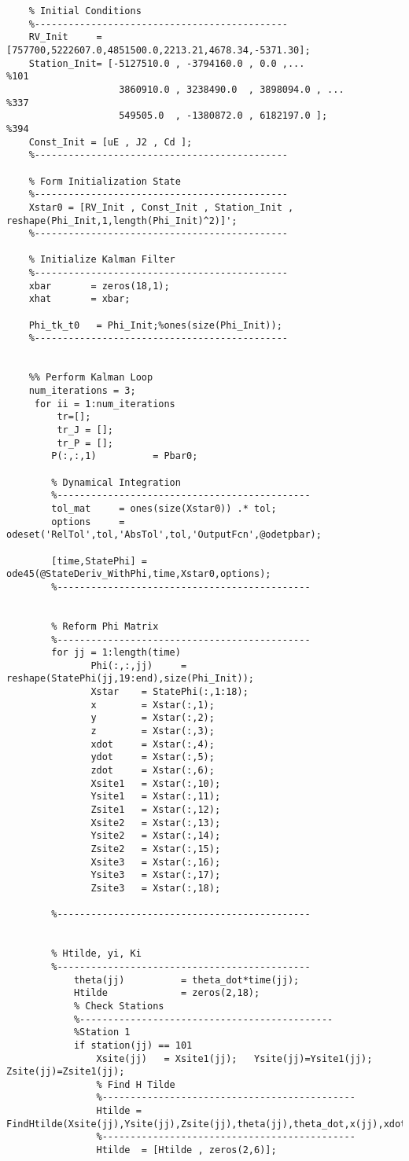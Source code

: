 \documentclass[12pt,a4paper,oneside]{article}
\numberwithin{equation}{section}   		%
\begin{document}
\begin{appendices}
\begin{lstlisting}
	% Initial Conditions
	%---------------------------------------------
	RV_Init     = [757700,5222607.0,4851500.0,2213.21,4678.34,-5371.30];
	Station_Init= [-5127510.0 , -3794160.0 , 0.0 ,...               %101
	                3860910.0 , 3238490.0  , 3898094.0 , ...        %337
	                549505.0  , -1380872.0 , 6182197.0 ];           %394
	Const_Init = [uE , J2 , Cd ];
	%---------------------------------------------
	
	% Form Initialization State
	%---------------------------------------------
	Xstar0 = [RV_Init , Const_Init , Station_Init , reshape(Phi_Init,1,length(Phi_Init)^2)]';
	%---------------------------------------------
	
	% Initialize Kalman Filter
	%---------------------------------------------
	xbar       = zeros(18,1);
	xhat       = xbar;
	
	Phi_tk_t0   = Phi_Init;%ones(size(Phi_Init));
	%---------------------------------------------
	
	
	%% Perform Kalman Loop
	num_iterations = 3;
	 for ii = 1:num_iterations
	     tr=[];
	     tr_J = [];
	     tr_P = [];
	    P(:,:,1)          = Pbar0;
	    
	    % Dynamical Integration
	    %---------------------------------------------
	    tol_mat     = ones(size(Xstar0)) .* tol;
	    options     = odeset('RelTol',tol,'AbsTol',tol,'OutputFcn',@odetpbar);
	
	    [time,StatePhi] = ode45(@StateDeriv_WithPhi,time,Xstar0,options);
	    %---------------------------------------------
	    
	   
	    % Reform Phi Matrix
	    %---------------------------------------------
	    for jj = 1:length(time)
	           Phi(:,:,jj)     = reshape(StatePhi(jj,19:end),size(Phi_Init));
	           Xstar    = StatePhi(:,1:18);
	           x        = Xstar(:,1);
	           y        = Xstar(:,2);
	           z        = Xstar(:,3);
	           xdot     = Xstar(:,4);
	           ydot     = Xstar(:,5);
	           zdot     = Xstar(:,6);
	           Xsite1   = Xstar(:,10);
	           Ysite1   = Xstar(:,11);
	           Zsite1   = Xstar(:,12);
	           Xsite2   = Xstar(:,13);
	           Ysite2   = Xstar(:,14);
	           Zsite2   = Xstar(:,15);
	           Xsite3   = Xstar(:,16);
	           Ysite3   = Xstar(:,17);
	           Zsite3   = Xstar(:,18);
	
	    %---------------------------------------------
	    
	    
	    % Htilde, yi, Ki
	    %---------------------------------------------
	        theta(jj)          = theta_dot*time(jj);
	        Htilde             = zeros(2,18);
	        % Check Stations
	        %---------------------------------------------
	        %Station 1
	        if station(jj) == 101
	            Xsite(jj)   = Xsite1(jj);   Ysite(jj)=Ysite1(jj);   Zsite(jj)=Zsite1(jj);
	            % Find H Tilde
	            %---------------------------------------------
	            Htilde = FindHtilde(Xsite(jj),Ysite(jj),Zsite(jj),theta(jj),theta_dot,x(jj),xdot(jj),y(jj),ydot(jj),z(jj),zdot(jj));
	            %---------------------------------------------
	            Htilde  = [Htilde , zeros(2,6)];
	            

\end{lstlisting}
\end{appendices}
\end{document}
